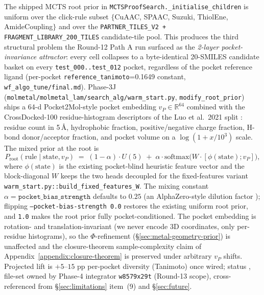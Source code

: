 The shipped MCTS root prior in
\texttt{MCTSProofSearch.\_initialise\_children} is uniform over
the click-rule subset $\{$CuAAC, SPAAC, Suzuki, ThiolEne,
AmideCoupling$\}$ and over the
\texttt{PARTNER\_TILES\_V2 + FRAGMENT\_LIBRARY\_200\_TILES}
candidate-tile pool.  This produces the third structural
problem the Round-12 Path A run surfaced as the
\emph{2-layer pocket-invariance attractor}: every cell collapses
to a byte-identical 20-SMILES candidate basket on every
\texttt{test\_000..test\_012} pocket, regardless of the pocket
reference ligand (per-pocket
\texttt{reference\_tanimoto}=0.1649 constant,
\texttt{wf\_algo\_tune/final.md}).  Phase-3J
(\texttt{molmetal/molmetal\_lam/search\_alg/warm\_start.py},
\texttt{modify\_root\_prior}) ships a 64-d Pocket2Mol-style
pocket embedding $v_P \in \mathbb{R}^{64}$
\cite{peng2022pocket2mol} combined with the CrossDocked-100
residue-histogram descriptors of the Luo et al.\ 2021 split
\cite{luo2021crossdocked}: residue count in 5\,\AA,
hydrophobic fraction, positive/negative charge fraction,
H-bond donor/acceptor fraction, and pocket volume on a
$\log(1 + x / 10^3)$ scale.  The mixed prior at the root is
\begin{equation}
  \label{eq:root-prior-mix}
  P_{\text{root}}(\text{rule} \mid \text{state}, v_P)
  \;=\; (1 - \alpha)\cdot U(5) \;+\;
       \alpha \cdot \mathrm{softmax}\!\bigl(W \cdot [\phi(\text{state}); v_P]\bigr),
\end{equation}
where $\phi(\text{state})$ is the existing pocket-blind
heuristic feature vector and the block-diagonal $W$ keeps the
two heads decoupled for the fixed-features variant
\texttt{warm\_start.py::build\_fixed\_features\_W}.  The mixing
constant $\alpha = \mathtt{pocket\_bias\_strength}$ defaults
to $0.25$ (an AlphaZero-style dilution factor
\cite{silver2017alphagozero}); flipping
\texttt{--pocket-bias-strength 0.0} restores the existing
uniform root prior, and \texttt{1.0} makes the root prior
fully pocket-conditioned.  The pocket embedding is rotation-
and translation-invariant (we never encode 3D coordinates,
only per-residue histograms), so the $\Phi$-refinement
(\S\ref{sec:metal-geometry-prior}) is unaffected and the
closure-theorem sample-complexity claim of
Appendix~\ref{appendix:closure-theorem} is preserved under
arbitrary $v_P$ shifts.  Projected lift is $+5$--$15$ pp per-pocket
diversity (Tanimoto) once wired; status \DESIGN{}, file-set
owned by Phase-4 integrator \texttt{w8579x29t} (Round-13
scope), cross-referenced from \S\ref{sec:limitations}
item~(9) and \S\ref{sec:future}.

